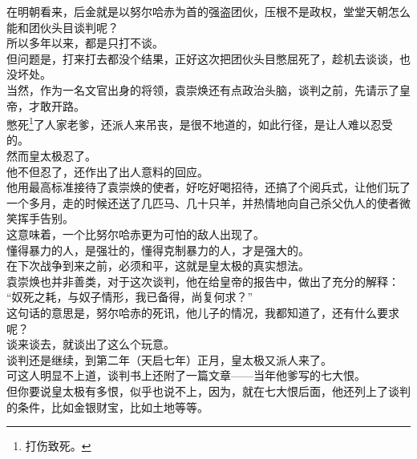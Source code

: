 \begin{multicols}{\theparacolNo}
在明朝看来，后金就是以努尔哈赤为首的强盗团伙，压根不是政权，堂堂天朝怎么能和团伙头目谈判呢？\\

所以多年以来，都是只打不谈。\\

但问题是，打来打去都没个结果，正好这次把团伙头目憋屈死了，趁机去谈谈，也没坏处。\\

当然，作为一名文官出身的将领，袁崇焕还有点政治头脑，谈判之前，先请示了皇帝，才敢开路。\\

憋死\footnote{打伤致死。}了人家老爹，还派人来吊丧，是很不地道的，如此行径，是让人难以忍受的。\\

然而皇太极忍了。\\

他不但忍了，还作出了出人意料的回应。\\

他用最高标准接待了袁崇焕的使者，好吃好喝招待，还搞了个阅兵式，让他们玩了一个多月，走的时候还送了几匹马、几十只羊，并热情地向自己杀父仇人的使者微笑挥手告别。\\

这意味着，一个比努尔哈赤更为可怕的敌人出现了。\\

懂得暴力的人，是强壮的，懂得克制暴力的人，才是强大的。\\

在下次战争到来之前，必须和平，这就是皇太极的真实想法。\\

袁崇焕也并非善类，对于这次谈判，他在给皇帝的报告中，做出了充分的解释：\\

“奴死之耗，与奴子情形，我已备得，尚复何求？”\\

这句话的意思是，努尔哈赤的死讯，他儿子的情况，我都知道了，还有什么要求呢？\\

谈来谈去，就谈出了这么个玩意。\\

谈判还是继续，到第二年（天启七年）正月，皇太极又派人来了。\\

可这人明显不上道，谈判书上还附了一篇文章——当年他爹写的七大恨。\\

但你要说皇太极有多恨，似乎也说不上，因为，就在七大恨后面，他还列上了谈判的条件，比如金银财宝，比如土地等等。\\


\end{multicols}
